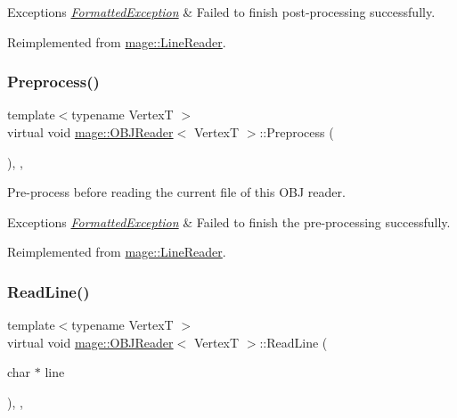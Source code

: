 \begin{DoxyExceptions}{Exceptions}
{\em \hyperlink{classmage_1_1_formatted_exception}{Formatted\+Exception}} & Failed to finish post-\/processing successfully. \\
\hline
\end{DoxyExceptions}


Reimplemented from \hyperlink{classmage_1_1_line_reader_adfde21013140a1058d3dd567204abfb5}{mage\+::\+Line\+Reader}.

\hypertarget{classmage_1_1_o_b_j_reader_ae3a3ad3b50f1dd8dffe3109fc7dc2937}{}\label{classmage_1_1_o_b_j_reader_ae3a3ad3b50f1dd8dffe3109fc7dc2937} 
\subsubsection{\texorpdfstring{Preprocess()}{Preprocess()}}
{\footnotesize\ttfamily template$<$typename VertexT $>$ \\
virtual void \hyperlink{classmage_1_1_o_b_j_reader}{mage\+::\+O\+B\+J\+Reader}$<$ VertexT $>$\+::Preprocess (\begin{DoxyParamCaption}{ }\end{DoxyParamCaption})\hspace{0.3cm}{\ttfamily [override]}, {\ttfamily [private]}, {\ttfamily [virtual]}}

Pre-\/process before reading the current file of this O\+BJ reader.


\begin{DoxyExceptions}{Exceptions}
{\em \hyperlink{classmage_1_1_formatted_exception}{Formatted\+Exception}} & Failed to finish the pre-\/processing successfully. \\
\hline
\end{DoxyExceptions}


Reimplemented from \hyperlink{classmage_1_1_line_reader_a4de135cfb0434be786cfcfd7959031ef}{mage\+::\+Line\+Reader}.

\hypertarget{classmage_1_1_o_b_j_reader_a8d4bd7be6de3098ba899cc36e3be1283}{}\label{classmage_1_1_o_b_j_reader_a8d4bd7be6de3098ba899cc36e3be1283} 
\subsubsection{\texorpdfstring{Read\+Line()}{ReadLine()}}
{\footnotesize\ttfamily template$<$typename VertexT $>$ \\
virtual void \hyperlink{classmage_1_1_o_b_j_reader}{mage\+::\+O\+B\+J\+Reader}$<$ VertexT $>$\+::Read\+Line (\begin{DoxyParamCaption}\item[{char $\ast$}]{line }\end{DoxyParamCaption})\hspace{0.3cm}{\ttfamily [override]}, {\ttfamily [private]}, {\ttfamily [virtual]}}

